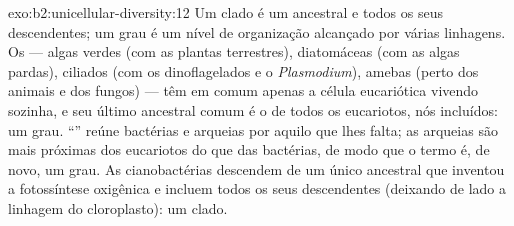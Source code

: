 \begin{solution}{exo:b2:unicellular-diversity:12}
Um clado é um ancestral e todos os seus descendentes; um grau é um
nível de organização alcançado por várias linhagens. Os  ---
algas verdes (com as plantas terrestres), diatomáceas (com as algas
pardas), ciliados (com os dinoflagelados e o \emph{Plasmodium}),
amebas (perto dos animais e dos fungos) --- têm em comum apenas a
célula eucariótica vivendo sozinha, e seu último ancestral comum é o
de todos os eucariotos, nós incluídos: um grau. ``'' reúne
bactérias e arqueias por aquilo que lhes falta; as arqueias são mais
próximas dos eucariotos do que das bactérias, de modo que o termo é,
de novo, um grau. As cianobactérias descendem de um único ancestral
que inventou a fotossíntese oxigênica e incluem todos os seus
descendentes (deixando de lado a linhagem do cloroplasto): um clado.
\end{solution}

